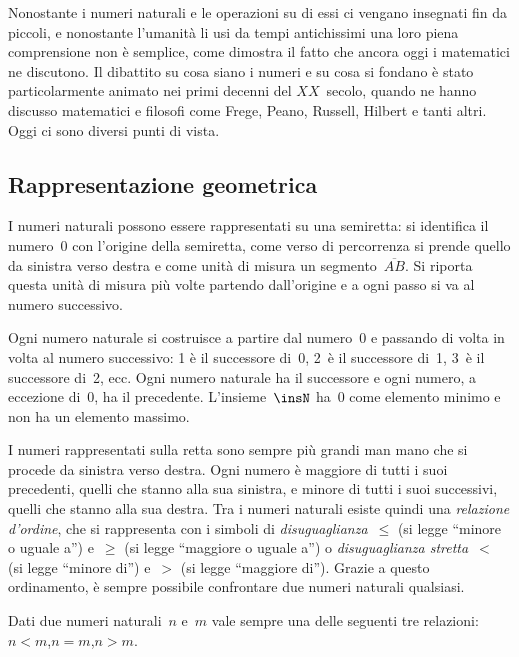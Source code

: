 Nonostante i numeri naturali e le operazioni su di essi ci vengano insegnati fin da
piccoli, e nonostante l'umanità li usi da tempi antichissimi una loro piena comprensione
non è semplice, come dimostra il fatto che ancora oggi i matematici ne discutono. Il
dibattito su cosa siano i numeri e su cosa si fondano è stato particolarmente animato nei
primi decenni del $XX$~secolo, quando ne hanno discusso matematici e filosofi come Frege,
Peano, Russell, Hilbert e tanti altri. Oggi ci sono diversi punti di vista.

\subsection{Rappresentazione geometrica}
I numeri naturali possono essere rappresentati su una semiretta: si identifica il numero~0
con l'origine della semiretta, come verso di percorrenza si prende quello da sinistra
verso destra e come unità di misura un segmento~$\overline{AB}$. Si riporta questa unità di misura
più volte partendo dall'origine e a ogni passo si va al numero successivo.
\begin{center}
 
\end{center}

Ogni numero naturale si costruisce a partire dal numero~0 e passando di volta in volta al
numero successivo: 1 è il successore di~0, 2~è il successore di~1, 3~è il successore di~2,
ecc. Ogni numero naturale ha il successore e ogni numero, a eccezione di~0, ha il
precedente. L'insieme~$\insN$ ha~0 come elemento minimo e non ha un elemento massimo.

I numeri rappresentati sulla retta sono sempre più grandi man mano che si procede da
sinistra verso destra. Ogni numero è maggiore di tutti i suoi precedenti, quelli che
stanno alla sua sinistra, e minore di tutti i suoi successivi, quelli che stanno alla sua
destra. Tra i numeri naturali esiste quindi una \emph{relazione d'ordine}, che si rappresenta con i simboli di
\emph{disuguaglianza}~$\le$ (si legge ``minore o uguale a'') e~$\ge$ (si legge ``maggiore o uguale a'') o \emph{disuguaglianza stretta}~$<$ (si legge ``minore di'') e~$>$ (si legge ``maggiore di'').
Grazie a questo ordinamento, è sempre possibile confrontare due numeri naturali qualsiasi.

\begin{legge}[di tricotomia]
Dati due numeri naturali~$n$ e~$m$ vale sempre una delle seguenti tre relazioni: \quad $n<m$,\quad $n=m$,\quad $n>m$.
\end{legge}

